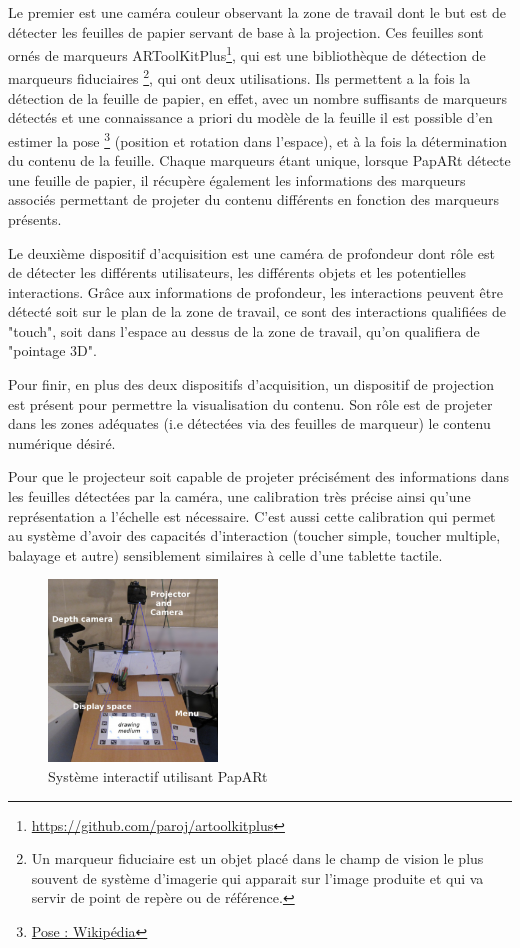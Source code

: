 Le premier est une caméra couleur observant la zone de travail dont le but est de détecter les feuilles de papier servant de base à la projection. Ces feuilles sont ornés de marqueurs ARToolKitPlus\footnote{\href{https://github.com/paroj/artoolkitplus}{https://github.com/paroj/artoolkitplus}}, qui est une bibliothèque de détection de marqueurs fiduciaires \footnote{Un marqueur fiduciaire est un objet placé dans le champ de vision le plus souvent de système d'imagerie qui apparait sur l'image produite et qui va servir de point de repère ou de référence.}, qui ont deux utilisations. Ils permettent a la fois la détection de la feuille de papier, en effet, avec un nombre suffisants de marqueurs détectés et une connaissance a priori du modèle de la feuille il est possible d'en estimer la pose \footnote{\href{https://en.wikipedia.org/wiki/Pose_(computer_vision)}{Pose : Wikipédia}} (position et rotation dans l'espace), et à la fois la détermination du contenu de la feuille. Chaque marqueurs étant unique, lorsque PapARt détecte une feuille de papier, il récupère également les informations des marqueurs associés permettant de projeter du contenu différents en fonction des marqueurs présents.

Le deuxième dispositif d'acquisition est une caméra de profondeur dont rôle est de détecter les différents utilisateurs, les différents objets et les potentielles interactions. Grâce aux informations de profondeur, les interactions peuvent être détecté soit sur le plan de la zone de travail, ce sont des interactions qualifiées de "touch", soit dans l'espace au dessus de la zone de travail, qu'on qualifiera de "pointage 3D".

Pour finir, en plus des deux dispositifs d'acquisition, un dispositif de projection est présent pour permettre la visualisation du contenu. Son rôle est de projeter dans les zones adéquates (i.e détectées via des feuilles de marqueur) le contenu numérique désiré.

Pour que le projecteur soit capable de projeter précisément des informations dans les feuilles détectées par la caméra, une calibration très précise ainsi qu'une représentation a l'échelle est nécessaire. C'est aussi cette calibration qui permet au système d'avoir des capacités d'interaction (toucher simple, toucher multiple, balayage et autre) sensiblement similaires à celle d'une tablette tactile. 

\begin{figure}[H]
\centering
\includegraphics[width=0.4\textwidth]{images/papart-system}
\caption{Système interactif utilisant PapARt\protect\footnotemark}
\label{fig:papartsystem}
\end{figure}

